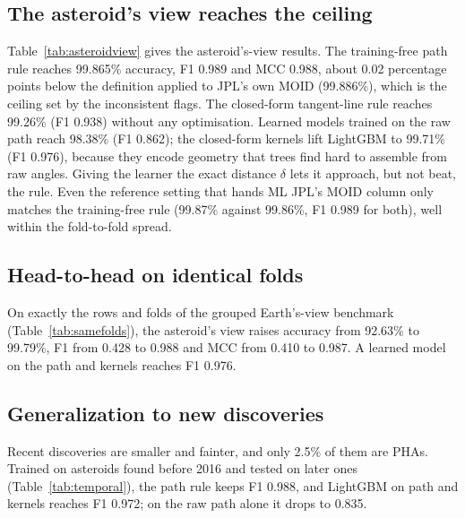 \documentclass[make,article,submit,moreauthors]{Definitions/mdpi}
\begin{document}
\subsection{The asteroid's view reaches the ceiling}
Table~\ref{tab:asteroidview} gives the asteroid's-view results. The training-free path rule reaches 99.865\% accuracy, F1 0.989 and MCC 0.988, about 0.02 percentage points below the definition applied to JPL's own MOID (99.886\%), which is the ceiling set by the inconsistent flags. The closed-form tangent-line rule reaches 99.26\% (F1 0.938) without any optimisation. Learned models trained on the raw path reach 98.38\% (F1 0.862); the closed-form kernels lift LightGBM to 99.71\% (F1 0.976), because they encode geometry that trees find hard to assemble from raw angles. Giving the learner the exact distance $\delta$ lets it approach, but not beat, the rule. Even the reference setting that hands ML JPL's MOID column only matches the training-free rule (99.87\% against 99.86\%, F1 0.989 for both), well within the fold-to-fold spread.

\subsection{Head-to-head on identical folds}
On exactly the rows and folds of the grouped Earth's-view benchmark (Table~\ref{tab:samefolds}), the asteroid's view raises accuracy from 92.63\% to 99.79\%, F1 from 0.428 to 0.988 and MCC from 0.410 to 0.987. A learned model on the path and kernels reaches F1 0.976.

\subsection{Generalization to new discoveries}
Recent discoveries are smaller and fainter, and only 2.5\% of them are PHAs. Trained on asteroids found before 2016 and tested on later ones (Table~\ref{tab:temporal}), the path rule keeps F1 0.988, and LightGBM on path and kernels reaches F1 0.972; on the raw path alone it drops to 0.835.
\end{document}
